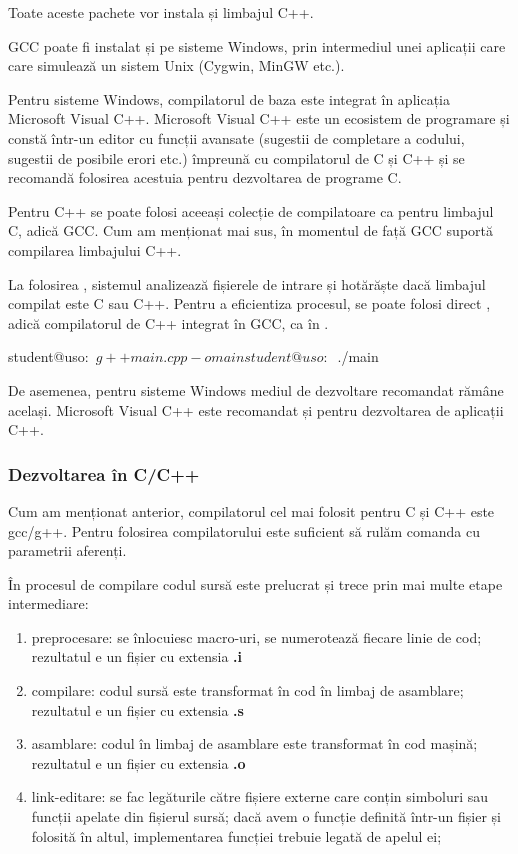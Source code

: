 Toate aceste pachete vor instala și limbajul C++.

GCC poate fi instalat și pe sisteme Windows, prin intermediul unei aplicații
care care simulează un sistem Unix (Cygwin, MinGW etc.).

Pentru sisteme Windows, compilatorul de baza este integrat în aplicația
Microsoft Visual C++. Microsoft Visual C++ este un ecosistem de programare și
constă într-un editor cu funcții avansate (sugestii de completare a codului,
sugestii de posibile erori etc.) împreună cu compilatorul de C și C++ și se
recomandă folosirea acestuia pentru dezvoltarea de programe C.

Pentru C++ se poate folosi aceeași colecție de compilatoare ca pentru limbajul
C, adică GCC. Cum am menționat mai sus, în momentul de față GCC suportă
compilarea limbajului C++.

La folosirea , sistemul analizează fișierele de intrare și hotărăște dacă
limbajul compilat este C sau C++. Pentru a eficientiza procesul, se poate folosi
direct , adică compilatorul de C++ integrat în GCC, ca în .

\begin{screen}[caption={Exemplu compilare si rulare C++},label={lst:appdev:simple-cpp}]
student@uso:~$ g++ main.cpp -o main
student@uso:~$ ./main
\end{screen}

De asemenea, pentru sisteme Windows mediul de dezvoltare recomandat rămâne
același. Microsoft Visual C++ este recomandat și pentru dezvoltarea de aplicații
C++.

\subsubsection{Dezvoltarea în C/C++}
\label{sec:appdev:dev-env:c-dev}

Cum am menționat anterior, compilatorul cel mai folosit pentru C și C++ este
gcc/g++. Pentru folosirea compilatorului este suficient să rulăm comanda
 cu parametrii aferenți.

În procesul de compilare codul sursă este prelucrat și trece prin mai multe
etape intermediare:

\begin{enumerate}
  \item preprocesare: se înlocuiesc macro-uri, se numerotează fiecare
          linie de cod; rezultatul e un fișier cu extensia \textbf{.i}
  \item compilare: codul sursă este transformat în cod în limbaj de
          asamblare; rezultatul e un fișier cu extensia \textbf{.s}
  \item asamblare: codul în limbaj de asamblare este transformat în cod
          mașină; rezultatul e un fișier cu extensia \textbf{.o}
  \item link-editare: se fac legăturile către fișiere externe care conțin
          simboluri sau funcții apelate din fișierul sursă; dacă avem o
          funcție definită într-un fișier și folosită în altul,
          implementarea funcției trebuie legată de apelul ei;
\end{enumerate}

